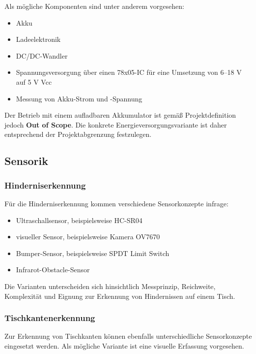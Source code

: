 Als mögliche Komponenten sind unter anderem vorgesehen:

\begin{itemize}
\tightlist
\item
  Akku
\item
  Ladeelektronik
\item
  DC/DC-Wandler
\item
  Spannungsversorgung über einen 78x05-IC für eine Umsetzung von 6--18 V
  auf 5 V Vcc
\item
  Messung von Akku-Strom und -Spannung
\end{itemize}

Der Betrieb mit einem aufladbaren Akkumulator ist gemäß
Projektdefinition jedoch \textbf{Out of Scope}. Die konkrete
Energieversorgungsvariante ist daher entsprechend der Projektabgrenzung
festzulegen.

\subsection{Sensorik}\label{sensorik}

\subsubsection{Hinderniserkennung}\label{hinderniserkennung}

Für die Hinderniserkennung kommen verschiedene Sensorkonzepte infrage:

\begin{itemize}
\tightlist
\item
  Ultraschallsensor, beispielsweise HC-SR04
\item
  visueller Sensor, beispielsweise Kamera OV7670
\item
  Bumper-Sensor, beispielsweise SPDT Limit Switch
\item
  Infrarot-Obstacle-Sensor
\end{itemize}

Die Varianten unterscheiden sich hinsichtlich Messprinzip, Reichweite,
Komplexität und Eignung zur Erkennung von Hindernissen auf einem Tisch.

\subsubsection{Tischkantenerkennung}\label{tischkantenerkennung}

Zur Erkennung von Tischkanten können ebenfalls unterschiedliche
Sensorkonzepte eingesetzt werden. Als mögliche Variante ist eine
visuelle Erfassung vorgesehen.

